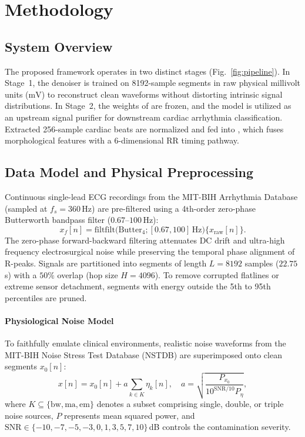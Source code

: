 \section{Methodology}
\label{sec:method}

\subsection{System Overview}
The proposed framework operates in two distinct stages (Fig.~\ref{fig:pipeline}). In Stage~1, the denoiser \HSL{} is trained on 8192-sample segments in raw physical millivolt units ($\mathrm{mV}$) to reconstruct clean waveforms without distorting intrinsic signal distributions. In Stage~2, the weights of \HSL{} are frozen, and the model is utilized as an upstream signal purifier for downstream cardiac arrhythmia classification. Extracted 256-sample cardiac beats are normalized and fed into \RRN{}, which fuses morphological features with a 6-dimensional RR timing pathway.

\subsection{Data Model and Physical Preprocessing}
\label{sec:preproc}
Continuous single-lead ECG recordings from the MIT-BIH Arrhythmia Database (sampled at $f_s = 360$\,Hz) are pre-filtered using a 4th-order zero-phase Butterworth bandpass filter ($0.67$--$100$\,Hz):
\begin{equation}
x_f[n] = \mathrm{filtfilt}\big(\mathrm{Butter}_4; [0.67, 100]\,\mathrm{Hz}\big)\{x_{\mathrm{raw}}[n]\}.
\end{equation}
The zero-phase forward-backward filtering attenuates DC drift and ultra-high frequency electrosurgical noise while preserving the temporal phase alignment of R-peaks. Signals are partitioned into segments of length $L = 8192$ samples ($22.75$\,s) with a $50\%$ overlap (hop size $H = 4096$). To remove corrupted flatlines or extreme sensor detachment, segments with energy outside the 5th to 95th percentiles are pruned.

\paragraph*{Physiological Noise Model}
To faithfully emulate clinical environments, realistic noise waveforms from the MIT-BIH Noise Stress Test Database (NSTDB) are superimposed onto clean segments $x_0[n]$:
\begin{equation}
x[n] = x_0[n] + a \sum_{k \in K} \eta_k[n], \quad a = \sqrt{\frac{P_{x_0}}{10^{\mathrm{SNR}/10} P_{\eta}}},
\label{eq:noise_model}
\end{equation}
where $K \subseteq \{\mathrm{bw}, \mathrm{ma}, \mathrm{em}\}$ denotes a subset comprising single, double, or triple noise sources, $P$ represents mean squared power, and $\mathrm{SNR} \in \{-10, -7, -5, -3, 0, 1, 3, 5, 7, 10\}$\,dB controls the contamination severity.

